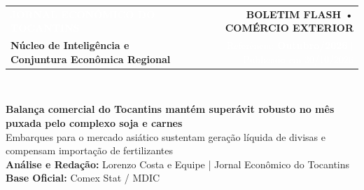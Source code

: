 \documentclass[10pt,a4paper]{article}
\begin{document}
\color{cinzatexto}

\noindent\colorbox{azulto}{%
  \parbox{\dimexpr\textwidth-2\fboxsep\relax}{%
    \vspace{6pt}%
    \begin{tabularx}{\linewidth}{@{}X r@{}}
      {\fontsize{15}{18}\selectfont\textbf{\textcolor{white}{JORNAL ECONÔMICO DO TOCANTINS}}} &
      \colorbox{douradoto}{\textbf{\footnotesize\textcolor{azulto}{\hspace{4pt}BOLETIM FLASH • COMÉRCIO EXTERIOR\hspace{4pt}}}} \\[4pt]
      {\footnotesize\textcolor{douradoto}{\textbf{Núcleo de Inteligência e Conjuntura Econômica Regional}}} &
      {\footnotesize\textcolor{white}{Referência: \textbf{Outubro/2026} $\vert$ Publicado em 30/10/2026}}
    \end{tabularx}%
    \vspace{4pt}%
  }%
}\\[-2pt]
\noindent{\color{douradoto}\rule{\textwidth}{2.5pt}}

\vspace{6pt}

{\fontsize{16}{20}\selectfont\textbf{\textcolor{azulto}{Balança comercial do Tocantins mantém superávit robusto no mês puxada pelo complexo soja e carnes}}}\\[4pt]
{\normalsize\textcolor{cinzasuave}{Embarques para o mercado asiático sustentam geração líquida de divisas e compensam importação de fertilizantes}}\\[4pt]
{\footnotesize\textcolor{azulto}{\textbf{Análise e Redação:}} \textcolor{cinzatexto}{Lorenzo Costa e Equipe | Jornal Econômico do Tocantins} \hfill \textcolor{azulto}{\textbf{Base Oficial:}} \textcolor{cinzatexto}{Comex Stat / MDIC}}

\vspace{2pt}

\noindent{}
\end{document}
